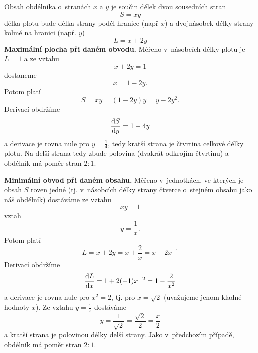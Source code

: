 \reseni
Obsah obdélníka o stranách $x$ a $y$ je součin délek dvou sousedních stran
\begin{equation*}
  S=xy
\end{equation*}
délka plotu bude délka strany podél hranice (např $x$) a dvojnásobek délky strany kolmé na hranici (např. $y$)
\begin{equation*}
  L=x+2y
\end{equation*}
\textbf{Maximální plocha při daném obvodu.}
Měřeno v násobcích délky plotu je $L=1$ a ze vztahu
\begin{equation*}
  x+2y=1
\end{equation*}
dostaneme
\begin{equation*}
  x=1-2y.
\end{equation*}
Potom platí
\begin{equation*}
  S=xy=(1-2y)y=y-2y^2.
\end{equation*}
Derivací obdržíme
\begin{equation*}
  \frac{\mathrm{d}S}{\mathrm{d}y}=1-4y
\end{equation*}
a derivace je rovna nule pro $y=\frac 14$, tedy kratší strana je čtvrtina celkové délky plotu. Na delší strana tedy zbude polovina (dvakrát odkrojím čtvrtinu) a obdélník má poměr stran $2:1$.

\textbf{Minimální obvod při daném obsahu.}
Měřeno v jednotkách, ve kterých je obsah $S$ roven jedné (tj. v násobcích délky strany čtverce o stejném obsahu jako náš obdélník) dostáváme ze vztahu
\begin{equation*}
  xy=1
\end{equation*}
vztah
\begin{equation*}
  y=\frac 1x.
\end{equation*}
Potom platí
\begin{equation*}
  L=x+2y=x+\frac 2x=x+2x^{-1}
\end{equation*}
Derivací obdržíme
\begin{equation*}
  \frac{\mathrm{d}L}{\mathrm{d}x}=1+2(-1)x^{-2}=1-\frac 2{x^2}
\end{equation*}
a derivace je rovna nule pro $x^2=2$, tj. pro $x=\sqrt{2}$ (uvažujeme jenom kladné hodnoty $x$). Ze vztahu $y=\frac 1x$ dostáváme
\begin{equation*}
  y=\frac 1{\sqrt 2}=\frac{\sqrt{2}}2=\frac x2
\end{equation*}
a kratší strana je polovinou délky delší strany. Jako v předchozím případě, obdélník má poměr stran $2:1$.

\konec




